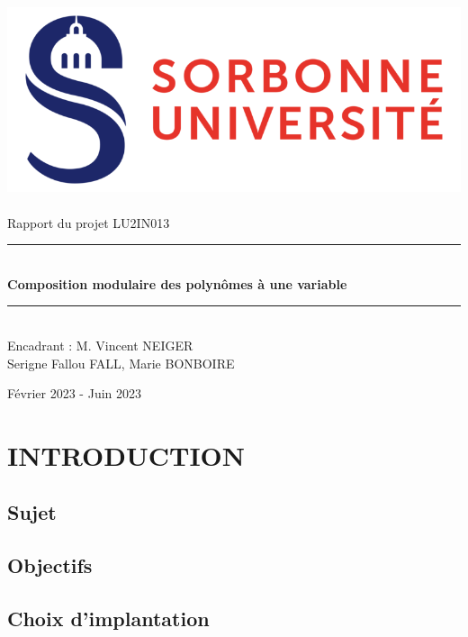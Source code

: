 \documentclass[a4paper]{article}
\begin{document}
\thispagestyle{plain}

\begin{titlepage}
    \begin{center}

        \bigskip
        \includegraphics[scale=0.5]{logo_su.jpg}~\\[4cm]

        {\LARGE Rapport du projet LU2IN013}\\[0.3cm]
        \rule{\linewidth}{0.5mm} \\[0.6cm]
        {\huge \textbf{Composition modulaire des polynômes à une variable}}\\[0.4cm]
        \rule{\linewidth}{0.5mm} \\[1cm]
        {\large Encadrant : M. Vincent NEIGER}\\[5cm]

        {\Large Serigne Fallou FALL, Marie BONBOIRE}
        
        \vfill
        Février 2023 - Juin 2023


    \end{center}
\end{titlepage}

\newpage

\tableofcontents

\newpage


\section{INTRODUCTION}
\subsection{Sujet}
\subsection{Objectifs}
\subsection{Choix d'implantation}
\end{document}
